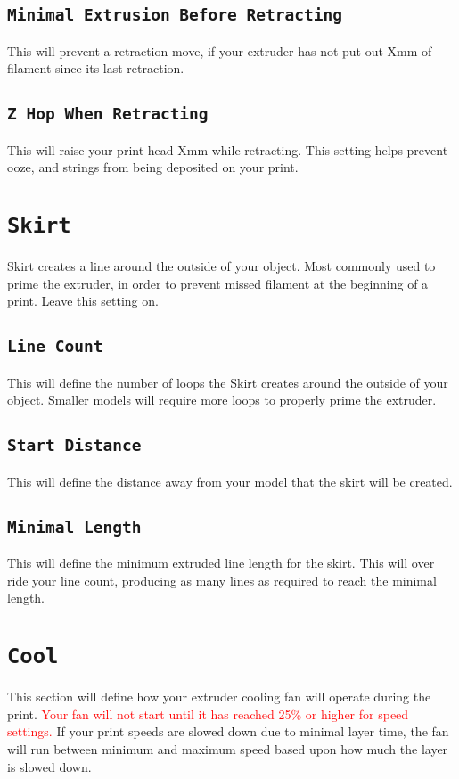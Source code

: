 \subsection{\texttt{Minimal Extrusion Before Retracting}}
This will prevent a retraction move, if your extruder has not put out Xmm of filament since its last retraction.

\subsection{\texttt{Z Hop When Retracting}}
This will raise your print head Xmm while retracting. This setting helps prevent ooze, and strings from being deposited on your print. 

\section{\texttt{Skirt}}
Skirt creates a line around the outside of your object. Most commonly used to prime the extruder, in order to prevent missed filament at the beginning of a print. Leave this setting on.

\subsection{\texttt{Line Count}}
This will define the number of loops the Skirt creates around the outside of your object. Smaller models will require more loops to properly prime the extruder.

\subsection{\texttt{Start Distance}}
This will define the distance away from your model that the skirt will be created. 

\subsection{\texttt{Minimal Length}}
This will define the minimum extruded line length for the skirt. This will over ride your line count, producing as many lines as required to reach the minimal length.

\section{\texttt{Cool}}
This section will define how your extruder cooling fan will operate during the print. \textcolor{red}{Your fan will not start until it has reached 25\% or higher for speed settings.} If your print speeds are slowed down due to minimal layer time, the fan will run between minimum and maximum speed based upon how much the layer is slowed down.

